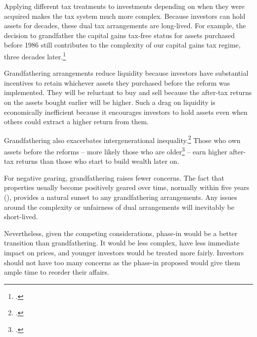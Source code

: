 Applying different tax treatments to investments depending on when they were acquired makes the tax system much more complex. Because investors can hold assets for decades, these dual tax arrangements are long-lived.  For example, the decision to grandfather the capital gains tax-free status for assets purchased before 1986 still contributes to the complexity of our capital gains tax regime, three decades later.\footcite[][75]{HenryTaxReview2010} 

Grandfathering arrangements reduce liquidity because investors have substantial incentives to retain whichever assets they purchased before the reform was implemented. They will be reluctant to buy and sell because the after-tax returns on the assets bought earlier will be higher. Such a drag on liquidity is economically inefficient because it encourages investors to hold assets even when others could extract a higher return from them. 

Grandfathering also exacerbates intergenerational inequality.\footcite{DaleyWoodWeidmannEtAl2014}  Those who own assets before the reforms – more likely those who are older\footcite[][14]{DaleyWoodWeidmannEtAl2014}  – earn higher after-tax returns than those who start to build wealth later on. 

For negative gearing, grandfathering raises fewer concerns. The fact that properties usually become positively geared over time, normally within five years (), provides a natural sunset to any grandfathering arrangements. Any issues around the complexity or unfairness of dual arrangements will inevitably be short-lived. 

Nevertheless, given the competing considerations, phase-in would be a better transition than grandfathering. It would be less complex, have less immediate impact on prices, and younger investors would be treated more fairly. Investors should not have too many concerns as the phase-in proposed would give them ample time to reorder their affairs.
















%

\makeatletter
\@openrightfalse
\makeatother


